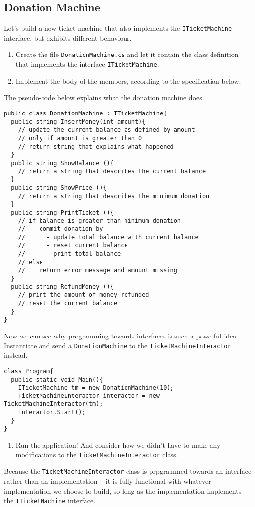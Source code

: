 \documentclass{article}
\newcounter{stepcounter}
\newenvironment{steps}{ 
  \begin{enumerate}[label=\color{red}Step \theenumi)]
    \setcounter{enumi}{\value{stepcounter}}
}{
  \setcounter{stepcounter}{\value{enumi}}
  \end{enumerate}
}
\begin{document}
\subsection{Donation Machine}
Let's build a new ticket machine that also implements the \texttt{ITicketMachine} interface, but exhibits different behaviour.
\begin{steps}
\item Create the file \texttt{DonationMachine.cs} and let it contain the class definition that implements the interface \texttt{ITicketMachine}.
\item Implement the body of the members, according to the specification below.
\end{steps}
The pseudo-code below explains what the donation machine does.
\begin{lstlisting}
public class DonationMachine : ITicketMachine{
  public string InsertMoney(int amount){
    // update the current balance as defined by amount
    // only if amount is greater than 0
    // return string that explains what happened
  }
  public string ShowBalance (){
    // return a string that describes the current balance
  }
  public string ShowPrice (){
    // return a string that describes the minimum donation
  }
  public string PrintTicket (){
    // if balance is greater than minimum donation
    //    commit donation by
    //      - update total balance with current balance
    //      - reset current balance
    //      - print total balance
    // else
    //    return error message and amount missing
  }
  public string RefundMoney (){
    // print the amount of money refunded
    // reset the current balance
  }
}
\end{lstlisting}
Now we can see why programming towards interfaces is such a powerful idea. Instantiate and send a \texttt{DonationMachine} to the \texttt{TicketMachineInteractor} instead.
\begin{lstlisting}
class Program{
  public static void Main(){
    ITicketMachine tm = new DonationMachine(10);
    TicketMachineInteractor interactor = new TicketMachineInteractor(tm);
    interactor.Start();
  }
}
\end{lstlisting}
\begin{steps}
\item Run the application! And consider how we didn't have to make any modifications to the \texttt{TicketMachineInteractor} class.
\end{steps}
Because the \texttt{TicketMachineInteractor} class is prpgrammed towards an interface rather than an implementation -- it is fully functional with whatever implementation we choose to build, so long as the implementation implements the \texttt{ITicketMachine} interface.
\end{document}
